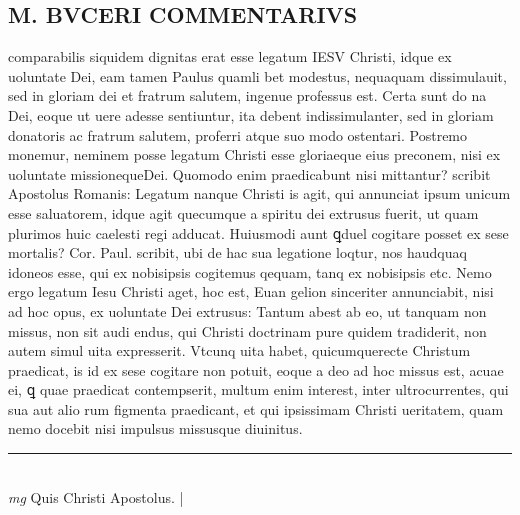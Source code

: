 \documentclass{article}
\begin{document}
\begin{pages}
\section*{M. BVCERI COMMENTARIVS }
\marginpar{[ p.18 ]}\pstart comparabilis siquidem dignitas erat esse legatum IESV Christi, idque ex uoluntate Dei, eam tamen Paulus quamli bet modestus, nequaquam dissimulauit, sed in gloriam dei et fratrum salutem, ingenue professus est. Certa sunt do na Dei, eoque ut uere adesse sentiuntur, ita debent indissimulanter, sed in gloriam donatoris ac fratrum salutem, proferri atque suo modo ostentari.  Postremo monemur, neminem posse legatum Christi esse gloriaeque eius preconem, nisi ex uoluntate missionequeDei.  Quomodo enim praedicabunt nisi mittantur? scribit Apostolus Romanis: Legatum nanque Christi is agit, qui annunciat ipsum unicum esse saluatorem, idque agit quecumque a spiritu dei extrusus fuerit, ut quam plurimos huic caelesti regi adducat.  Huiusmodi aunt ꝗduel cogitare posset ex sese mortalis? Cor. Paul.  scribit, ubi de hac sua legatione loqtur, nos haudquaq idoneos esse, qui ex nobisipsis cogitemus qequam, tanq ex nobisipsis etc.  Nemo ergo legatum Iesu Christi aget, hoc est, Euan gelion sinceriter annunciabit, nisi ad hoc opus, ex uoluntate Dei extrusus:  \pend\pstart Tantum abest ab eo, ut tanquam non missus, non sit audi endus, qui Christi doctrinam pure quidem tradiderit, non autem simul uita expresserit. Vtcunq uita habet, quicumquerecte Christum praedicat, is id ex sese cogitare non potuit, eoque a deo ad hoc missus est, acuae ei, ꝗ quae praedicat contempserit, multum enim interest, inter ultrocurrentes, qui sua aut alio rum figmenta praedicant, et qui ipsissimam Christi ueritatem, quam nemo docebit nisi impulsus missusque diuinitus.   \pend
\vspace{0.5cm}\noindent
\vspace{0.2cm}\rule{1cm}{0.2pt}\\ 
\hspace{0.2cm}\textit{mg}
\footnotesize Quis Christi Apostolus.  
\normalsize| 

\end{pages}
\end{document}
